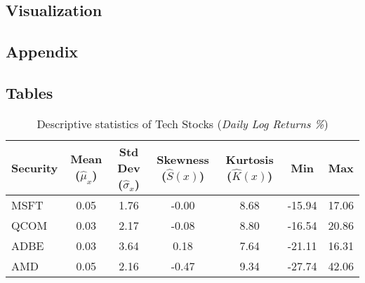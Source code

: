 \documentclass[12pt]{article}
\begin{document}
\subsection{Visualization}
\newpage
\begin{appendices}
\section{Appendix}
\subsection{Tables}
\begin{table}[ht]
	\centering
	\caption{Descriptive statistics of Tech Stocks (\textit{Daily Log Returns \%})}
	\begin{tabular}[t]{lcccccc}
		\toprule
		Security & Mean ($\hat{\mu}_x$) & Std Dev ($\hat{\sigma}_x$) & Skewness ($\hat{S}(x)$) & Kurtosis ($\hat{K}(x)$) &Min&Max \\
		\midrule
		MSFT & 0.05 & 1.76 &-0.00 & 8.68 &-15.94 &17.06  \\
		QCOM & 0.03 & 2.17 &-0.08 & 8.80 &-16.54 & 20.86 \\	
		ADBE & 0.03 & 3.64 & 0.18 & 7.64 &-21.11 &16.31 \\
		AMD  & 0.05 & 2.16 &-0.47 & 9.34 &-27.74 &42.06 \\				   
		\bottomrule
	\end{tabular}\label{tab:log_descriptive}
\end{table}
\end{appendices}
	
\end{document}
